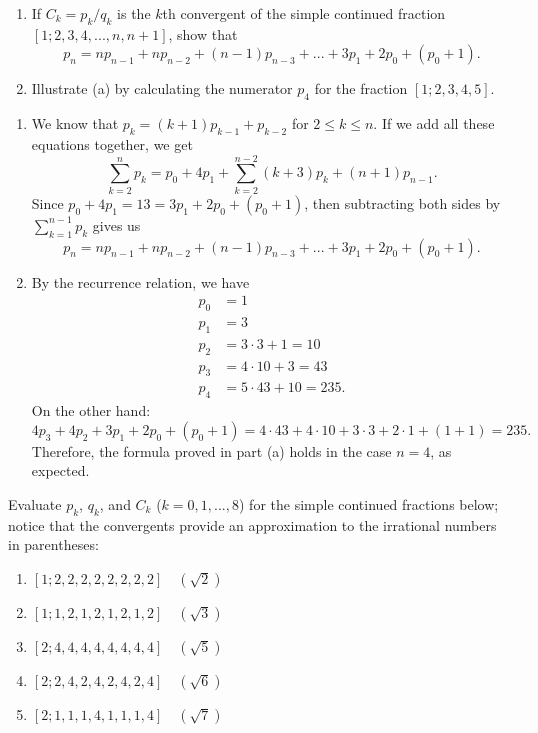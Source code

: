 \begin{exercise}
    \begin{enumerate}
        \item If $C_k = p_k/q_k$ is the $k$th convergent of the simple continued fraction $[1; 2, 3, 4, ..., n, n+1]$, show that
        $$p_n = np_{n-1} + np_{n-2} + (n-1)p_{n-3} + ... + 3p_1 + 2p_0 + (p_0 + 1).$$
        \item Illustrate (a) by calculating the numerator $p_4$ for the fraction $[1; 2, 3, 4, 5]$. \\
    \end{enumerate}
\end{exercise}

\begin{solution}
    \begin{enumerate}
        \item We know that $p_k = (k+1)p_{k-1} + p_{k-2}$ for $2 \leq k \leq n$. If we add all these equations together, we get
        $$\sum_{k=2}^{n}p_k = p_0 + 4p_1 + \sum_{k=2}^{n-2}(k+3)p_k + (n+1)p_{n-1}.$$
        Since $p_0 + 4p_1 = 13 = 3p_1 + 2p_0 + (p_0 + 1)$, then subtracting both sides by $\sum_{k=1}^{n-1}p_k$ gives us 
        $$p_n = np_{n-1} + np_{n-2} + (n-1)p_{n-3} + ... + 3p_1 + 2p_0 + (p_0 + 1).$$
        \item By the recurrence relation, we have
        \begin{align*}
            p_0 &= 1 \\
            p_1 &= 3 \\
            p_2 &= 3\cdot 3 + 1 = 10 \\
            p_3 &= 4\cdot 10 + 3 = 43 \\
            p_4 &= 5\cdot 43 + 10 = 235.
        \end{align*}
        On the other hand:
        $$4p_3 + 4p_2 + 3p_1 + 2p_0 + (p_0 + 1) = 4\cdot 43 + 4 \cdot 10 + 3\cdot 3 + 2\cdot 1 + (1 + 1) = 235.$$
        Therefore, the formula proved in part (a) holds in the case $n = 4$, as expected. \\
    \end{enumerate}
\end{solution}

\begin{exercise}
    Evaluate $p_k$, $q_k$, and $C_k$ ($k = 0, 1, ..., 8$) for the simple continued fractions below; notice that the convergents provide an approximation to the irrational numbers in parentheses:
    \begin{enumerate}
        \item $[1; 2, 2, 2, 2, 2, 2, 2, 2] \quad (\sqrt{2})$
        \item $[1; 1, 2, 1, 2, 1, 2, 1, 2] \quad (\sqrt{3})$
        \item $[2; 4, 4, 4, 4, 4, 4, 4, 4] \quad (\sqrt{5})$
        \item $[2; 2, 4, 2, 4, 2, 4, 2, 4] \quad (\sqrt{6})$
        \item $[2; 1, 1, 1, 4, 1, 1, 1, 4] \quad (\sqrt{7})$ \\
    \end{enumerate}
\end{exercise}


